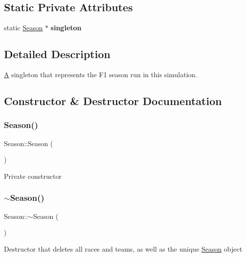 \subsection*{Static Private Attributes}
\begin{DoxyCompactItemize}
\item 
\mbox{\label{classSeason_ab85c84f66c2dca8651d0a6d21b72f49a}} 
static \hyperlink{classSeason}{Season} $\ast$ {\bfseries singleton}
\end{DoxyCompactItemize}


\subsection{Detailed Description}
\hyperlink{classA}{A} singleton that represents the F1 season run in this simulation. 

\subsection{Constructor \& Destructor Documentation}
\mbox{\label{classSeason_a069a1041ff9a2a2d918ad5e3bb062a08}} 
\subsubsection{\texorpdfstring{Season()}{Season()}}
{\footnotesize\ttfamily Season\+::\+Season (\begin{DoxyParamCaption}{ }\end{DoxyParamCaption})\hspace{0.3cm}{\ttfamily [private]}}

Private constructor \mbox{\label{classSeason_a7dd3d83b670a108aa5a00f214757717e}} 
\subsubsection{\texorpdfstring{$\sim$\+Season()}{~Season()}}
{\footnotesize\ttfamily Season\+::$\sim$\+Season (\begin{DoxyParamCaption}{ }\end{DoxyParamCaption})}

Destructor that deletes all races and teams, as well as the unique \hyperlink{classSeason}{Season} object 

